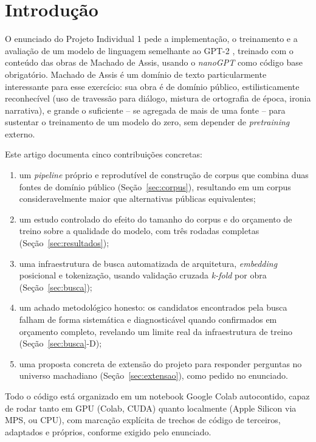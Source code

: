 \documentclass[conference]{IEEEtran}
\begin{document}
\section{Introdução}

O enunciado do Projeto Individual 1 pede a implementação, o treinamento e a
avaliação de um modelo de linguagem semelhante ao GPT-2 \cite{radford2019gpt2},
treinado com o conteúdo das obras de Machado de Assis, usando o
\textit{nanoGPT} \cite{karpathy_nanogpt} como código base obrigatório. Machado
de Assis é um domínio de texto particularmente interessante para esse
exercício: sua obra é de domínio público, estilisticamente reconhecível (uso
de travessão para diálogo, mistura de ortografia de época, ironia narrativa),
e grande o suficiente -- se agregada de mais de uma fonte -- para sustentar o
treinamento de um modelo do zero, sem depender de \textit{pretraining} externo.

Este artigo documenta cinco contribuições concretas:
\begin{enumerate}
  \item um \emph{pipeline} próprio e reprodutível de construção de corpus que
        combina duas fontes de domínio público (Seção~\ref{sec:corpus}),
        resultando em um corpus consideravelmente maior que alternativas
        públicas equivalentes;
  \item um estudo controlado do efeito do tamanho do corpus e do orçamento de
        treino sobre a qualidade do modelo, com três rodadas completas
        (Seção~\ref{sec:resultados});
  \item uma infraestrutura de busca automatizada de arquitetura,
        \textit{embedding} posicional e tokenização, usando validação cruzada
        \textit{k-fold} por obra (Seção~\ref{sec:busca});
  \item um achado metodológico honesto: os candidatos encontrados pela busca
        falham de forma sistemática e diagnosticável quando confirmados em
        orçamento completo, revelando um limite real da infraestrutura de
        treino (Seção~\ref{sec:busca}-D);
  \item uma proposta concreta de extensão do projeto para responder perguntas
        no universo machadiano (Seção~\ref{sec:extensao}), como pedido no
        enunciado.
\end{enumerate}

Todo o código está organizado em um notebook Google Colab autocontido, capaz
de rodar tanto em GPU (Colab, CUDA) quanto localmente (Apple Silicon via MPS,
ou CPU), com marcação explícita de trechos de código de terceiros, adaptados e
próprios, conforme exigido pelo enunciado.
\end{document}
